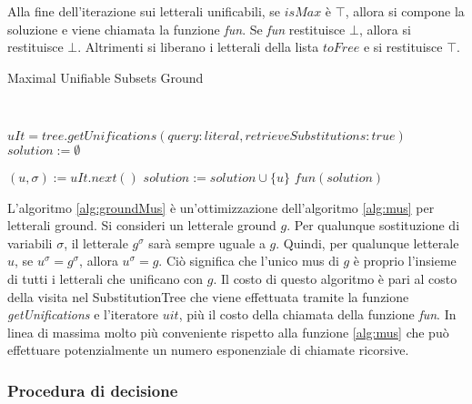 \documentclass[./main.tex]{subfiles}
\begin{document}
Alla fine dell'iterazione sui letterali unificabili, se $isMax$ è $\top$, 
allora si compone la soluzione e viene chiamata la funzione \textit{fun}.
Se \textit{fun} restituisce $\bot$, allora si restituisce $\bot$.
Altrimenti si liberano i letterali della lista $toFree$ e si restituisce $\top$.


\begin{algorithm}[H] \label{alg:groundMus}
    \caption{Maximal Unifiable Subsets Ground}
    \\

$uIt = tree.getUnifications(query: literal, retrieveSubstitutions: true)$\;
$solution := \emptyset$\;

 {
    $(u, \sigma) := uIt.next()$\;
     {
        $solution := solution \cup \{u\}$\;
    }
}
\Return $fun(solution)$\;
\end{algorithm}

L'algoritmo \ref{alg:groundMus} è un'ottimizzazione dell'algoritmo \ref{alg:mus} per letterali ground.
Si consideri un letterale ground $g$. Per qualunque sostituzione di variabili $\sigma$, 
il letterale $g^\sigma$ sarà sempre uguale a $g$. Quindi, per qualunque letterale $u$, se $u^\sigma = g^\sigma$, allora $u^\sigma = g$.
Ciò significa che l'unico mus di $g$ è proprio l'insieme di tutti i letterali che unificano con $g$.
Il costo di questo algoritmo è pari al costo della visita nel SubstitutionTree che viene effettuata tramite la funzione \textit{getUnifications}
e l'iteratore $uit$,
più il costo della chiamata della funzione \textit{fun}.
In linea di massima molto più conveniente rispetto alla funzione \ref{alg:mus} che può effettuare potenzialmente un numero esponenziale 
di chiamate ricorsive. 


\subsubsection{Procedura di decisione}
\end{document}
